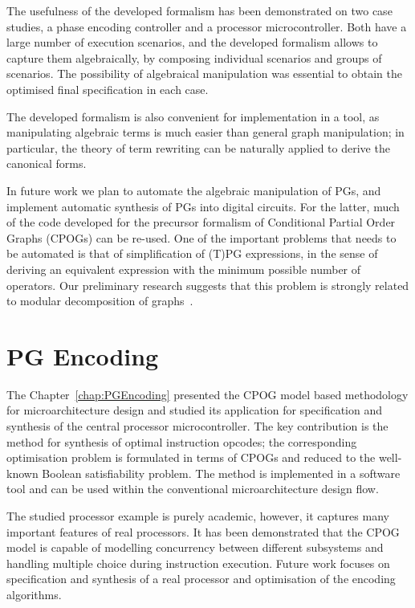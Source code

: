 The usefulness of the developed formalism has been demonstrated on
two case studies, a phase encoding controller and a processor microcontroller.
Both have a large number of execution scenarios, and the developed
formalism allows to capture them algebraically, by composing individual
scenarios and groups of scenarios. The possibility of algebraical
manipulation was essential to obtain the optimised final specification
in each case.

The developed formalism is also convenient for implementation in a
tool, as manipulating algebraic terms is much easier than general
graph manipulation; in particular, the theory of term rewriting can
be naturally applied to derive the canonical forms.

In future work we plan to automate the algebraic manipulation of PGs,
and implement automatic synthesis of PGs into digital circuits. For
the latter, much of the code developed for the precursor formalism
of Conditional Partial Order Graphs (CPOGs) can be re-used. One of
the important problems that needs to be automated is that of simplification
of (T)PG expressions, in the sense of deriving an equivalent expression
with the minimum possible number of operators. Our preliminary research
suggests that this problem is strongly related to modular decomposition
of graphs~\cite{2005_McConnell_modular}.\\

\section{PG Encoding}

The Chapter~\ref{chap:PGEncoding} presented the CPOG model based methodology for microarchitecture
design and studied its application for specification and synthesis
of the central processor microcontroller. The key contribution is
the method for synthesis of optimal instruction opcodes; the corresponding
optimisation problem is formulated in terms of CPOGs and reduced to
the well-known Boolean satisfiability problem. The method is implemented
in a software tool and can be used within the conventional microarchitecture
design flow.

The studied processor example is purely academic, however, it captures
many important features of real processors. It has been demonstrated
that the CPOG model is capable of modelling concurrency between different
subsystems and handling multiple choice during instruction execution.
Future work focuses on specification and synthesis of a real processor
and optimisation of the encoding algorithms.


